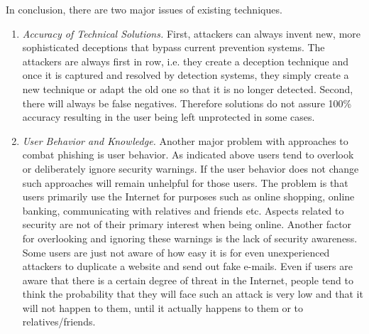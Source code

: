 In conclusion, there are two major issues of existing techniques.
\begin{enumerate}
	\item\textit{Accuracy of Technical Solutions.} First, attackers can always invent new, more sophisticated deceptions that bypass current prevention systems.
	 The attackers are always first in row, i.e. they create a deception technique and once it is captured and resolved by detection systems, they simply create a new technique or adapt the old one so that it is no longer detected.
	 Second, there will always be false negatives.
	 Therefore solutions do not assure 100\% accuracy resulting in the user being left unprotected in some cases.
	\item\textit{User Behavior and Knowledge.} Another major problem with approaches to combat phishing is user behavior.
 As indicated above users tend to overlook or deliberately ignore security warnings.
 If the user behavior does not change such approaches will remain unhelpful for those users.
 The problem is that users primarily use the Internet for purposes such as online shopping, online banking, communicating with relatives and friends etc.
 Aspects related to security are not of their primary interest when being online.
 Another factor for overlooking and ignoring these warnings is the lack of security awareness.
 Some users are just not aware of how easy it is for even unexperienced attackers to duplicate a website and send out fake e-mails.
 Even if users are aware that there is a certain degree of threat in the Internet, people tend to think the probability that they will face such an attack is very low and that it will not happen to them, until it actually happens to them or to relatives/friends.
\end{enumerate}
 
